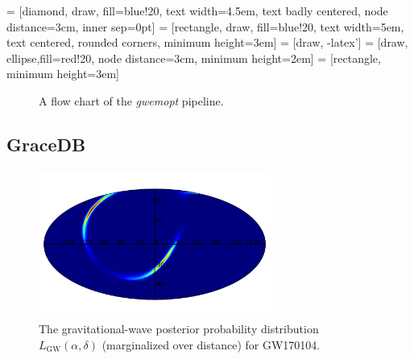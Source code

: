 \documentclass[twocolumn]{aastex62}
\begin{document}
 = [diamond, draw, fill=blue!20,
    text width=4.5em, text badly centered, node distance=3cm, inner sep=0pt]
 = [rectangle, draw, fill=blue!20,
    text width=5em, text centered, rounded corners, minimum height=3em]
 = [draw, -latex']
 = [draw, ellipse,fill=red!20, node distance=3cm,
    minimum height=2em]
 = [rectangle, minimum height=3em]

\begin{figure}[t]
 \begin{center}
 \end{center}
 \caption{A flow chart of the \emph{gwemopt} pipeline.}
 \label{fig:flowchart}
\end{figure}

\subsection{GraceDB}
\label{subsection:gracedb}

\begin{figure}[t]
\hspace*{-0.5cm}
\centering
\includegraphics[width=3in]{prob.pdf}
\caption{The gravitational-wave posterior probability distribution $L_\textrm{GW}(\alpha,\delta)$ (marginalized over distance) for GW170104.}
 \label{fig:skymap}
 \end{figure}
\end{document}
